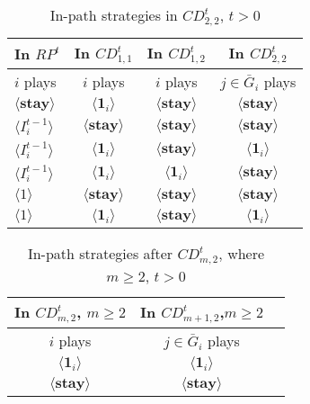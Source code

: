 \documentclass[12pt,letter]{article}
\theoremstyle{definition}
\theoremstyle{remark}
\theoremstyle{claim}
\begin{document}
\begin{table}[t]
\caption{In-path strategies in $CD^t_{2,2}$, $t>0$}
\label{Table_stg_cdt12}
\begin{center}
\begin{tabular}{l c c c}
In $RP^t$ 	 	&  	In $CD^t_{1,1}$		&  In $CD^t_{1,2}$	  & In $CD^t_{2,2}$ \\
\hline
\hline
$i$ plays 		                             &  	$i$ plays		&				$i$ plays			& $j\in \bar{G}_i$ plays  \\
\hline
$\langle  \textbf{stay} \rangle$ 	& 	$\langle \mathbf{1}_i \rangle$	&  $\langle \textbf{stay} \rangle$ &  $\langle \textbf{stay} \rangle$ \\
$\langle  {I^{t-1}_i} \rangle$ 		&  $\langle \textbf{stay} \rangle$	&	$\langle \textbf{stay} \rangle$ &  $\langle \textbf{stay} \rangle$   \\
$\langle  {I^{t-1}_i} \rangle$ 		&  $\langle \mathbf{1}_i \rangle$	&	$\langle \textbf{stay} \rangle$ &  $\langle \mathbf{1}_i \rangle$    \\
$\langle  {I^{t-1}_i} \rangle$ 		&  $\langle \mathbf{1}_i \rangle$	&	$\langle \mathbf{1}_i \rangle$ &  $\langle \textbf{stay} \rangle$  \\
$\langle 1 \rangle$ 		             &  $\langle \textbf{stay} \rangle$	&	$\langle \textbf{stay} \rangle$ &  $\langle \textbf{stay} \rangle$\\
$\langle 1 \rangle$ 		             &  $\langle \mathbf{1}_i \rangle$	&	$\langle \textbf{stay} \rangle$ & $\langle \mathbf{1}_i \rangle$
\end{tabular}
\end{center}
\end{table}

\begin{table}[t]
\caption{In-path strategies after $CD^t_{m,2}$, where $m\geq 2$, $t>0$}
\label{Table_stg_cdtm2}
\begin{center}
\begin{tabular}{c c c}
In $CD^t_{m,2}$, $m\geq 2$ 	 	&  	In $CD^t_{m+1,2}$,$m\geq 2$		& 	\\
\hline
\hline
$i$ plays 		  							&  $j\in \bar{G}_{i}$ plays  								& \\
\hline
$\langle \mathbf{1}_i \rangle$ 	& 	$\langle \mathbf{1}_i \rangle$	    &  \\
$\langle \textbf{stay} \rangle$		&  $\langle \textbf{stay} \rangle$	&  \\

\end{tabular}
\end{center}
\end{table}
\end{document}
